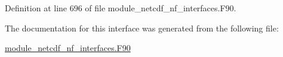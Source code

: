 Definition at line 696 of file module\+\_\+netcdf\+\_\+nf\+\_\+interfaces.\+F90.



The documentation for this interface was generated from the following file\+:\begin{DoxyCompactItemize}
\item 
\hyperlink{module__netcdf__nf__interfaces_8F90}{module\+\_\+netcdf\+\_\+nf\+\_\+interfaces.\+F90}\end{DoxyCompactItemize}
